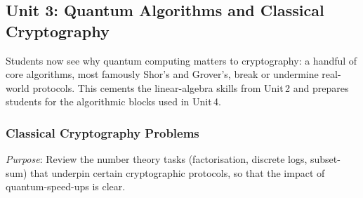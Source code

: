 \subsection{Unit 3: Quantum Algorithms and Classical Cryptography}

Students now see why quantum computing matters to cryptography:
a handful of core algorithms, most famously Shor's and Grover's, break or undermine real-world protocols. 
This cements the linear-algebra skills from Unit\,2 and prepares students for the algorithmic blocks used in Unit\,4.




\subsubsection{Classical Cryptography Problems}

\emph{Purpose}: Review the number theory tasks (factorisation, discrete logs, subset-sum) 
that underpin certain cryptographic protocols, so that the impact of quantum-speed-ups is clear.



